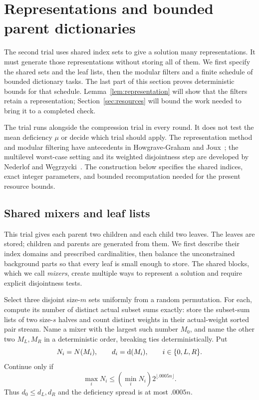 \section{Representations and bounded parent dictionaries}
\label{sec:representation}

The second trial uses shared index sets to give a solution many
representations. It must generate those representations without storing
all of them. We first specify the shared sets and the leaf lists,
then the modular filters and a finite schedule of bounded dictionary
tasks. The last part of this section proves deterministic bounds for
that schedule. Lemma~\ref{lem:representation} will show that the filters
retain a representation; Section~\ref{sec:resources} will bound the
work needed to bring it to a completed check.

The trial runs alongside the compression trial in every round. It does
not test the mean deficiency $\mu$ or decide which trial should apply.
The representation method and modular filtering have antecedents in
Howgrave-Graham and Joux~\cite{HJ10}; the multilevel worst-case setting
and its weighted disjointness step are developed by Nederlof and
W\k{e}grzycki~\cite{NW21}. The construction below specifies the shared
indices, exact integer parameters, and bounded recomputation needed
for the present resource bounds.

\subsection{Shared mixers and leaf lists}\label{alg:layout}

This trial gives each parent two children and each child two leaves.
The leaves are stored; children and parents are generated from them.
We first describe their index domains and prescribed cardinalities,
then balance the unconstrained background parts so that every leaf is
small enough to store. The shared blocks, which we call \emph{mixers}, create multiple ways to
represent a solution and require explicit disjointness tests.

Select three disjoint size-$m$ sets uniformly from a random permutation.
For each, compute its number of distinct actual subset sums exactly: store
the subset-sum lists of two size-$s$ halves and count distinct weights in
their actual-weight sorted pair stream.  Name a mixer with the largest
such number $M_0$, and name the other two $M_L,M_R$ in a deterministic
order, breaking ties deterministically.  Put
\[
 N_i=N(M_i),\qquad d_i=\mathrm{d}(M_i),\qquad i\in\{0,L,R\}.
\]
Continue only if
\begin{equation}\label{eq:spread}
  \max_iN_i\le (\min_iN_i)2^{\lfloor .0005n\rfloor}.
\end{equation}
Thus $d_0\le d_L,d_R$ and the deficiency spread is at most $.0005n$.

